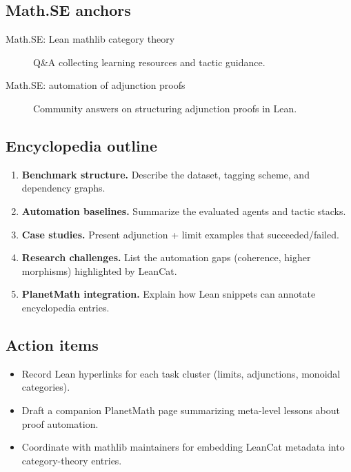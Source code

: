 \subsection*{Math.SE anchors}
\begin{description}
  \item[Math.SE: Lean mathlib category theory] Q\&A collecting learning resources and tactic guidance.
  \item[Math.SE: automation of adjunction proofs] Community answers on structuring adjunction proofs in Lean.
\end{description}
\subsection*{Encyclopedia outline}
\begin{enumerate}
  \item \textbf{Benchmark structure.} Describe the dataset, tagging scheme, and dependency graphs.
  \item \textbf{Automation baselines.} Summarize the evaluated agents and tactic stacks.
  \item \textbf{Case studies.} Present adjunction + limit examples that succeeded/failed.
  \item \textbf{Research challenges.} List the automation gaps (coherence, higher morphisms) highlighted by LeanCat.
  \item \textbf{PlanetMath integration.} Explain how Lean snippets can annotate encyclopedia entries.
\end{enumerate}
\subsection*{Action items}
\begin{itemize}
  \item Record Lean hyperlinks for each task cluster (limits, adjunctions, monoidal categories).
  \item Draft a companion PlanetMath page summarizing meta-level lessons about proof automation.
  \item Coordinate with mathlib maintainers for embedding LeanCat metadata into category-theory entries.
\end{itemize}
